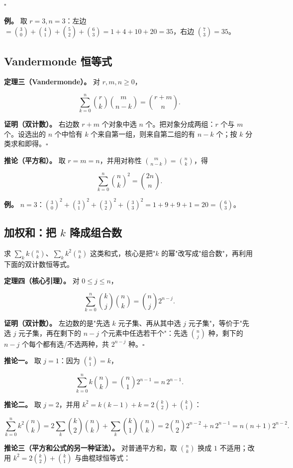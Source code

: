 $\square$

\textbf{例。} 取 $r=3,n=3$：左边 $=\binom30+\binom41+\binom52+\binom63=1+4+10+20=35$，右边 $\binom{7}{3}=35$。

\subsection{Vandermonde 恒等式}


\textbf{定理三（Vandermonde）。} 对 $r,m,n\ge0$，

\[
\sum_{k=0}^{n}\binom rk\binom m{n-k}=\binom{r+m}{n}.
\]

\textbf{证明（双计数）。} 右边数 $r+m$ 个对象中选 $n$ 个。把对象分成两组：$r$ 个与 $m$ 个。设选出的 $n$ 个中恰有 $k$ 个来自第一组，则来自第二组的有 $n-k$ 个；按 $k$ 分类求和即得。$\square$

\textbf{推论（平方和）。} 取 $r=m=n$，并用对称性 $\binom m{n-k}=\binom nk$，得

\[
\sum_{k=0}^{n}\binom nk^2=\binom{2n}{n}.
\]

\textbf{例。} $n=3$：$\binom30^2+\binom31^2+\binom32^2+\binom33^2=1+9+9+1=20=\binom63$。

\subsection{加权和：把 $k$ 降成组合数}


求 $\sum_k k\binom nk$、$\sum_k k^2\binom nk$ 这类和式，核心是把"$k$ 的幂"改写成"组合数"，再利用下面的双计数恒等式。

\textbf{定理四（核心引理）。} 对 $0\le j\le n$，

\[
\sum_{k=0}^{n}\binom kj\binom nk=\binom nj 2^{n-j}.
\]

\textbf{证明（双计数）。} 左边数的是"先选 $k$ 元子集、再从其中选 $j$ 元子集"，等价于"先选 $j$ 元子集，再在剩下的 $n-j$ 个元素中任选若干个"：先选 $\binom nj$ 种，剩下的 $n-j$ 个每个都有选/不选两种，共 $2^{n-j}$ 种。$\square$

\textbf{推论一。} 取 $j=1$：因为 $\binom k1=k$，

\[
\sum_{k=0}^{n}k\binom nk=\binom n1 2^{n-1}=n\,2^{n-1}.
\]

\textbf{推论二。} 取 $j=2$，并用 $k^2=k(k-1)+k=2\binom k2+\binom k1$：

\[
\sum_{k=0}^{n}k^2\binom nk
=2\sum_k\binom k2\binom nk+\sum_k\binom k1\binom nk
=2\binom n2 2^{n-2}+n\,2^{n-1}
=n(n+1)2^{n-2}.
\]

\textbf{推论三（平方和公式的另一种证法）。} 对普通平方和，取 $\binom nk$ 换成 $1$ 不适用；改用 $k^2=2\binom k2+\binom k1$ 与曲棍球恒等式：

